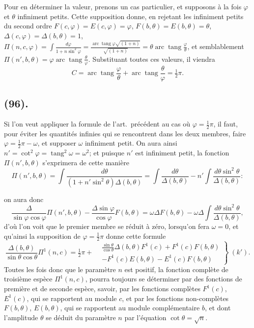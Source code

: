 \documentclass{article}
\begin{document}
Pour en déterminer la valeur, prenons un cas particulier, et supposons à la fois $\varphi$ et $\theta$ infiniment petits. Cette supposition donne, en rejetant les infiniment petits du second ordre $F(c,\varphi)=E(c,\varphi)=\varphi$, $F(b,\theta)=E(b,\theta)=\theta$, $\Delta(c,\varphi)=\Delta(b,\theta)=1$, $\Pi(n,c,\varphi)=\displaystyle\int\frac{d\varphi}{1+n\sin^{2}\varphi}=\frac{\operatorname{arc}\operatorname{tang}\varphi\sqrt{(1+n)}}{\sqrt{(1+n)}}=\theta\operatorname{arc}\operatorname{tang}\frac{\varphi}{\theta}$, et semblablement $\Pi(n',b,\theta)=\varphi\operatorname{arc}\operatorname{tang}\frac{\theta}{\varphi}$. Substituant toutes ces valeurs, il viendra
\[ C=\operatorname{arc}\operatorname{tang}\frac{\varphi}{\theta}+\operatorname{arc}\operatorname{tang}\frac{\theta}{\varphi}=\tfrac{1}{2}\pi. \]

\subsection*{(96).}

Si l'on veut appliquer la formule de l'art.\ précédent au cas où $\varphi=\tfrac{1}{2}\pi$, il faut, pour éviter les quantités infinies qui se rencontrent dans les deux membres, faire $\varphi=\tfrac{1}{2}\pi-\omega$, et supposer $\omega$ infiniment petit. On aura ainsi $n'=\cot^{2}\varphi=\operatorname{tang}^{2}\omega=\omega^{2}$; et puisque $n'$ est infiniment petit, la fonction $\Pi(n',b,\theta)$ s'exprimera de cette manière
\[ \Pi(n',b,\theta)=\int\frac{d\theta}{(1+n'\sin^{2}\theta)\Delta(b,\theta)}=\int\frac{d\theta}{\Delta(b,\theta)}-n'\int\frac{d\theta\sin^{2}\theta}{\Delta(b,\theta)}: \]

on aura donc
\[ \frac{\Delta}{\sin\varphi\cos\varphi}\Pi(n',b,\theta)-\frac{\Delta\sin\varphi}{\cos\varphi}F(b,\theta)=\omega\Delta F(b,\theta)-\omega\Delta\int\frac{d\theta\sin^{2}\theta}{\Delta(b,\theta)}, \]
d'où l'on voit que le premier membre se réduit à zéro, lorsqu'on fera $\omega=0$, et qu'ainsi la supposition de $\varphi=\tfrac{1}{2}\pi$ donne cette formule
\[ \frac{\Delta(b,\theta)}{\sin\theta\cos\theta}\Pi^{1}(n,c)=\tfrac{1}{2}\pi+\left.\begin{aligned} &\frac{\sin\theta}{\cos\theta}\Delta(b,\theta)F^{1}(c)+F^{1}(c)F(b,\theta)\\ &-F^{1}(c)E(b,\theta)-E^{1}(c)F(b,\theta) \end{aligned}\right\}\;(k'). \]
Toutes les fois donc que le paramètre $n$ est positif, la fonction complète de troisième espèce $\Pi^{1}(n,c)$, pourra toujours se déterminer par des fonctions de première et de seconde espèce, savoir, par les fonctions complètes $F^{1}(c)$, $E^{1}(c)$, qui se rapportent au module $c$, et par les fonctions non-complètes $F(b,\theta)$, $E(b,\theta)$, qui se rapportent au module complémentaire $b$, et dont l'amplitude $\theta$ se déduit du paramètre $n$ par l'équation $\cot\theta=\sqrt{n}$.
\end{document}
